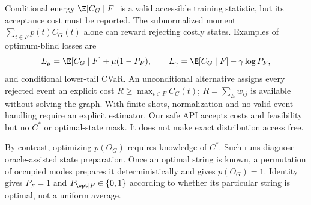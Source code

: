 Conditional energy $\E[C_G\mid F]$ is a valid accessible training statistic, but its acceptance cost must be reported. The subnormalized moment $\sum_{t\in F}p(t)C_G(t)$ alone can reward rejecting costly states. Examples of optimum-blind losses are
\begin{equation}
 L_\mu=\E[C_G\mid F]+\mu(1-P_F),\qquad
 L_\gamma=\E[C_G\mid F]-\gamma\log P_F,\label{eq:train}
\end{equation}
and conditional lower-tail CVaR. An unconditional alternative assigns every rejected event an explicit cost $R\ge\max_{t\in F}C_G(t)$; $R=\sum_Ew_{ij}$ is available without solving the graph. With finite shots, normalization and no-valid-event handling require an explicit estimator. Our safe API accepts costs and feasibility but no $C^*$ or optimal-state mask. It does not make exact distribution access free.

By contrast, optimizing $p(O_G)$ requires knowledge of $C^*$. Such runs diagnose oracle-assisted state preparation. Once an optimal string is known, a permutation of occupied modes prepares it deterministically and gives $p(O_G)=1$. Identity gives $P_F=1$ and $P_{\opt\mid F}\in\{0,1\}$ according to whether its particular string is optimal, not a uniform average.

